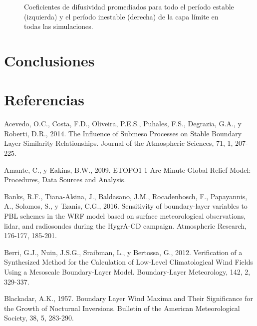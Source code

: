 \documentclass[12pt,spanish,oneside]{book}
\begin{document}
\begin{figure}

{\centering {}\newline{}

}

\caption{Coeficientes de difusividad promediados para todo el período estable (izquierda) y el período inestable (derecha) de la capa límite en todas las simulaciones. \label{kh_wrf}}\label{fig:k_ulke_wrf}
\end{figure}

\chapter{Conclusiones}\label{conclusiones}

\chapter*{Referencias}\label{referencias}

\hypertarget{refs}{}
\hypertarget{ref-Acevedo2014}{}
Acevedo, O.C., Costa, F.D., Oliveira, P.E.S., Puhales, F.S., Degrazia,
G.A., y Roberti, D.R., 2014. The Influence of Submeso Processes on
Stable Boundary Layer Similarity Relationships. Journal of the
Atmospheric Sciences, 71, 1, 207-225.

\hypertarget{ref-Amante2009}{}
Amante, C., y Eakins, B.W., 2009. ETOPO1 1 Arc-Minute Global Relief
Model: Procedures, Data Sources and Analysis.

\hypertarget{ref-Banks2016}{}
Banks, R.F., Tiana-Alsina, J., Baldasano, J.M., Rocadenbosch, F.,
Papayannis, A., Solomos, S., y Tzanis, C.G., 2016. Sensitivity of
boundary-layer variables to PBL schemes in the WRF model based on
surface meteorological observations, lidar, and radiosondes during the
HygrA-CD campaign. Atmospheric Research, 176-177, 185-201.

\hypertarget{ref-Berri2012}{}
Berri, G.J., Nuin, J.S.G., Sraibman, L., y Bertossa, G., 2012.
Verification of a Synthesized Method for the Calculation of Low-Level
Climatological Wind Fields Using a Mesoscale Boundary-Layer Model.
Boundary-Layer Meteorology, 142, 2, 329-337.

\hypertarget{ref-Blackadar1957}{}
Blackadar, A.K., 1957. Boundary Layer Wind Maxima and Their Significance
for the Growth of Nocturnal Inversions. Bulletin of the American
Meteorological Society, 38, 5, 283-290.
\end{document}
